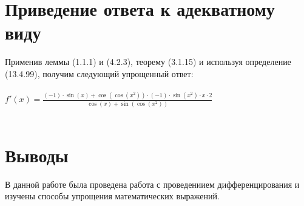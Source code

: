 \documentclass[a4paper,12pt]{article} %
\begin{document}
\section{Приведение ответа к адекватному виду}

Применив леммы (1.1.1) и (4.2.3), теорему (3.1.15) и используя определение (13.4.99), получим следующий упрощенный ответ:\\ 
 \hspace{1cm}\\ 
 

$ f'(x) =  \frac{ \left(-1\right) \cdot  \sin\left({x} \right) +  \cos\left( \cos\left({x} ^ {{2}} \right) \right) \cdot \left(-1\right) \cdot  \sin\left({x} ^ {{2}} \right) \cdot {x} \cdot {2} }{  \cos\left({x} \right) +  \sin\left( \cos\left({x} ^ {{2}} \right) \right) }  $\\ 
 \hspace{1cm}\\ 
 

\section{Выводы}

В данной работе была проведена работа с проведениием дифференцирования и изучены способы упрощения математических выражений.
\end{document}
